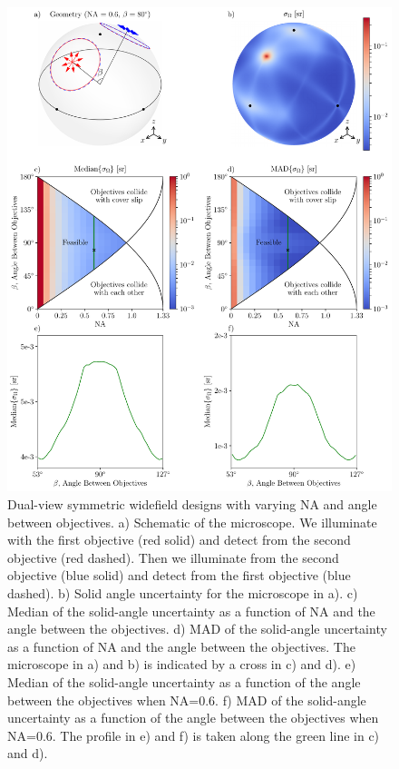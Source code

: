 \documentclass[10pt]{article}
\begin{document}
\begin{figure}[htbp]
\centering\includegraphics[width=\textwidth]{symmetric-widefield}
\caption{Dual-view symmetric widefield designs with varying NA and angle between
  objectives. a) Schematic of the microscope. We illuminate with the first objective
  (red solid) and detect from the second objective (red dashed). Then we
  illuminate from the second objective (blue solid) and detect from the first
  objective (blue dashed). b) Solid angle uncertainty for the microscope in
  a). c) Median of the solid-angle uncertainty as a function of NA and the angle
  between the objectives. d) MAD of the solid-angle uncertainty as a function of NA
  and the angle between the objectives. The microscope in a) and b) is indicated
  by a cross in c) and d). e) Median of the solid-angle uncertainty as a
  function of the angle between the objectives when NA=0.6. f) MAD of the
  solid-angle uncertainty as a function of the angle between the objectives when
  NA=0.6. The profile in e) and f) is taken along the green line in c) and d).}
\label{fig:symmetric-widefield}
\end{figure}
\end{document}
